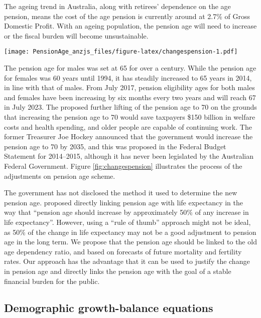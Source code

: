 \documentclass[
  doublespace]{anzsauth}
\let\origfigure\figure
\let\endorigfigure\endfigure
\renewenvironment{figure}[1][2] {
    \expandafter\origfigure\expandafter[tbp]
} {
    \endorigfigure
}
\begin{document}
The ageing trend in Australia, along with retirees' dependence on the age pension, means the cost of the age pension is currently around at 2.7\% of Gross Domestic Profit. With an ageing population, the pension age will need to increase or the fiscal burden will become unsustainable.

\begin{figure}
\centering
\texttt{[image: PensionAge\_anzjs\_files/figure-latex/changespension-1.pdf]}
\caption{\label{fig:changespension}Australian pension age policies.}
\end{figure}

The pension age for males was set at 65 for over a century. While the pension age for females was 60 years until 1994, it has steadily increased to 65 years in 2014, in line with that of males. From July 2017, pension eligibility ages for both males and females have been increasing by six months every two years and will reach 67 in July 2023. The \citet{PC13} proposed further lifting of the pension age to 70 on the grounds that increasing the pension age to 70 would save taxpayers \$150 billion in welfare costs and health spending, and older people are capable of continuing work. The former Treasurer Joe Hockey announced that the government would increase the pension age to 70 by 2035, and this was proposed in the Federal Budget Statement for 2014--2015, although it has never been legislated by the Australian Federal Government. Figure \ref{fig:changespension} illustrates the process of the adjustments on pension age scheme.

The government has not disclosed the method it used to determine the new pension age. \citet[p7]{CEDA07} proposed directly linking pension age with life expectancy in the way that ``pension age should increase by approximately 50\% of any increase in life expectancy''. However, using a ``rule of thumb'' approach might not be ideal, as 50\% of the change in life expectancy may not be a good adjustment to pension age in the long term. We propose that the pension age should be linked to the old age dependency ratio, and based on forecasts of future mortality and fertility rates. Our approach has the advantage that it can be used to justify the change in pension age and directly links the pension age with the goal of a stable financial burden for the public.

\hypertarget{demographic-growth-balance-equations}{%
\subsection{Demographic growth-balance equations}\label{demographic-growth-balance-equations}}
\end{document}
